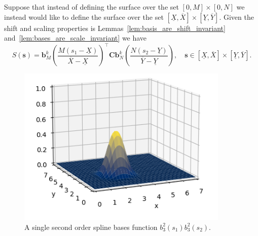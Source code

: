 \documentclass{article}
\newcommand{\bbf}{\mathbf{b}}
\newcommand{\sbf}{\mathbf{s}}
\newcommand{\Cbf}{\mathbf{C}}
\begin{document}
Suppose that instead of defining the surface over the set $[0, M]\times[0, N]$ we instead would like to define the surface over the set $[\underline{X}, \overline{X}]\times[\underline{Y}, \overline{Y}]$.  Given the shift and scaling properties is Lemmas~\ref{lem:basis_are_shift_invariant} and~\ref{lem:bases_are_scale_invariant} we have 
\begin{equation}\label{eq:spline_surface3}
S(\sbf) = \bbf^k_M\left(\frac{M(s_1-\underline{X})}{\overline{X}-\underline{X}}\right)^\top \Cbf \bbf^k_N\left(\frac{N(s_2-\underline{Y})}{\overline{Y}-\underline{Y}}\right), \quad \sbf\in[\underline{X}, \overline{X}]\times[\underline{Y}, \overline{Y}].
\end{equation}

\begin{figure}[hbt]
  \centering\includegraphics[width=0.9\textwidth]{./figures/spline_surface_basis}
  \caption{A single second order spline bases function $b_3^2(s_1)b_3^2(s_2)$.}
  \label{fig:spline_surface_bases}  
\end{figure}
\end{document}

